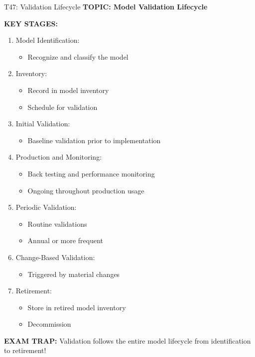 \documentclass[8pt]{beamer}
\begin{document}
	\begin{frame}{T47: Validation Lifecycle}
		\fontsize{6.5}{7.5}\selectfont
		\textbf{TOPIC: Model Validation Lifecycle}
		
		\vspace{0.1cm}
		\textbf{KEY STAGES:}
		\begin{enumerate}
			\item \textcolor{myblue}{Model Identification:}
			\begin{itemize}
				\item Recognize and classify the model
			\end{itemize}
			\item \textcolor{myblue}{Inventory:}
			\begin{itemize}
				\item Record in model inventory
				\item Schedule for validation
			\end{itemize}
			\item \textcolor{myblue}{Initial Validation:}
			\begin{itemize}
				\item Baseline validation prior to implementation
			\end{itemize}
			\item \textcolor{myblue}{Production and Monitoring:}
			\begin{itemize}
				\item Back testing and performance monitoring
				\item Ongoing throughout production usage
			\end{itemize}
			\item \textcolor{myblue}{Periodic Validation:}
			\begin{itemize}
				\item Routine validations
				\item Annual or more frequent
			\end{itemize}
			\item \textcolor{myblue}{Change-Based Validation:}
			\begin{itemize}
				\item Triggered by material changes
			\end{itemize}
			\item \textcolor{myblue}{Retirement:}
			\begin{itemize}
				\item Store in retired model inventory
				\item Decommission
			\end{itemize}
		\end{enumerate}
		
		\textcolor{myred}{\textbf{EXAM TRAP:}} Validation follows the \textcolor{myblue}{entire model lifecycle from identification to retirement}!
	\end{frame}
	
\end{document}
